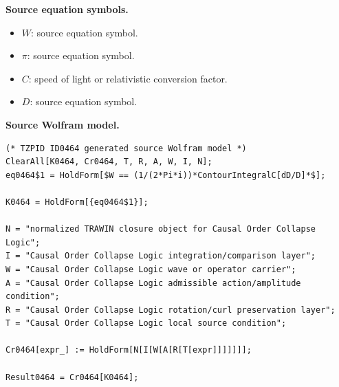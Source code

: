 \begin{minipage}[t]{0.49\linewidth}
\begingroup
\small
\raggedright
\textbf{Source equation symbols.}\par
\begin{itemize}[leftmargin=1.35em,itemsep=1pt,topsep=1pt,parsep=0pt]
    \item $W$: source equation symbol.
    \item $\pi$: source equation symbol.
    \item $C$: speed of light or relativistic conversion factor.
    \item $D$: source equation symbol.
\end{itemize}
\endgroup
\end{minipage}\hfill
\begin{minipage}[t]{0.47\linewidth}
\begingroup
\scriptsize
\raggedright
\textbf{Source Wolfram model.}\par
\begin{Verbatim}[fontsize=\tiny,breaklines=true,breakanywhere=true]
(* TZPID ID0464 generated source Wolfram model *)
ClearAll[K0464, Cr0464, T, R, A, W, I, N];
eq0464$1 = HoldForm[$W == (1/(2*Pi*i))*ContourIntegralC[dD/D]*$];

K0464 = HoldForm[{eq0464$1}];

N = "normalized TRAWIN closure object for Causal Order Collapse Logic";
I = "Causal Order Collapse Logic integration/comparison layer";
W = "Causal Order Collapse Logic wave or operator carrier";
A = "Causal Order Collapse Logic admissible action/amplitude condition";
R = "Causal Order Collapse Logic rotation/curl preservation layer";
T = "Causal Order Collapse Logic local source condition";

Cr0464[expr_] := HoldForm[N[I[W[A[R[T[expr]]]]]]];

Result0464 = Cr0464[K0464];
\end{Verbatim}
\endgroup
\end{minipage}

